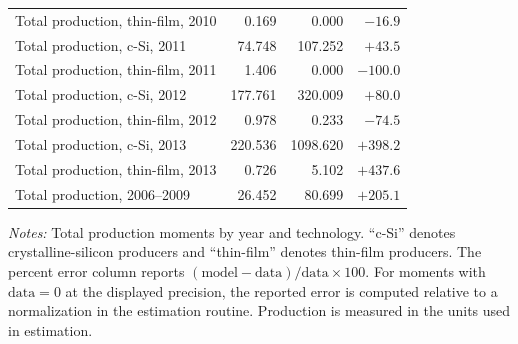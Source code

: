 \documentclass[12pt]{article}
\begin{document}
\begin{table}[htbp]
\begin{tabular}{lrrr}
Total production, thin-film, 2010 & 0.169 & 0.000 & $-16.9$ \\
Total production, c-Si, 2011 & 74.748 & 107.252 & $+43.5$ \\
Total production, thin-film, 2011 & 1.406 & 0.000 & $-100.0$ \\
Total production, c-Si, 2012 & 177.761 & 320.009 & $+80.0$ \\
Total production, thin-film, 2012 & 0.978 & 0.233 & $-74.5$ \\
Total production, c-Si, 2013 & 220.536 & 1098.620 & $+398.2$ \\
Total production, thin-film, 2013 & 0.726 & 5.102 & $+437.6$ \\
\addlinespace
Total production, 2006--2009 & 26.452 & 80.699 & $+205.1$ \\
\bottomrule
\end{tabular}
\begin{minipage}{0.85\textwidth}
\footnotesize
\vspace{0.5em}
\textit{Notes:} Total production moments by year and technology. ``c-Si'' denotes crystalline-silicon producers and ``thin-film'' denotes thin-film producers. The percent error column reports $(\text{model} - \text{data})/\text{data} \times 100$. For moments with $\text{data} = 0$ at the displayed precision, the reported error is computed relative to a normalization in the estimation routine. Production is measured in the units used in estimation.
\end{minipage}
\end{table}
 
\end{document}
